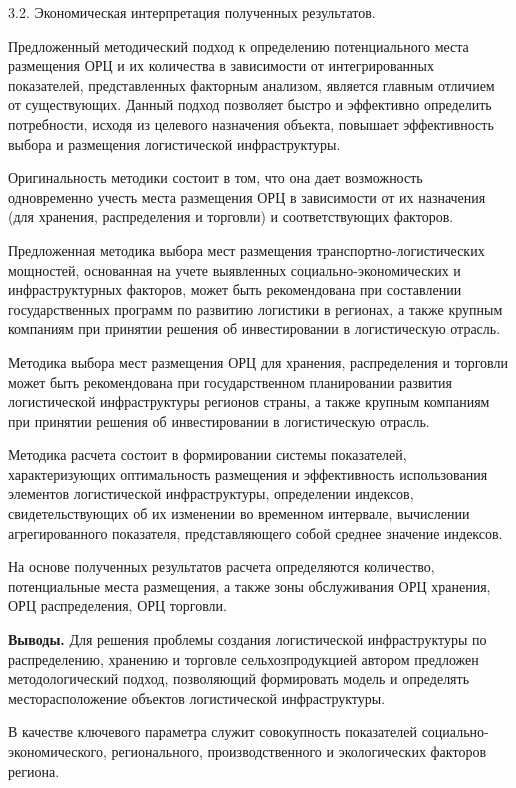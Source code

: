 3.2. Экономическая интерпретация полученных результатов.

Предложенный методический подход к определению потенциального места
размещения ОРЦ и их количества в зависимости от интегрированных
показателей, представленных факторным анализом, является главным
отличием от существующих. Данный подход позволяет быстро и эффективно
определить потребности, исходя из целевого назначения объекта, повышает
эффективность выбора и размещения логистической инфраструктуры.

Оригинальность методики состоит в том, что она дает возможность
одновременно учесть места размещения ОРЦ в зависимости от их назначения
(для хранения, распределения и торговли) и соответствующих факторов.

Предложенная методика выбора мест размещения транспортно-логистических
мощностей, основанная на учете выявленных социально-экономических и
инфраструктурных факторов, может быть рекомендована при составлении
государственных программ по развитию логистики в регионах, а также
крупным компаниям при принятии решения об инвестировании в логистическую
отрасль.

Методика выбора мест размещения ОРЦ для хранения, распределения и
торговли может быть рекомендована при государственном планировании
развития логистической инфраструктуры регионов страны, а также крупным
компаниям при принятии решения об инвестировании в логистическую
отрасль.

Методика расчета состоит в формировании системы показателей,
характеризующих оптимальность размещения и эффективность использования
элементов логистической инфраструктуры, определении индексов,
свидетельствующих об их изменении во временном интервале, вычислении
агрегированного показателя, представляющего собой среднее значение
индексов.

На основе полученных результатов расчета определяются количество,
потенциальные места размещения, а также зоны обслуживания ОРЦ хранения,
ОРЦ распределения, ОРЦ торговли.

{\bfseries Выводы.} Для решения проблемы создания логистической
инфраструктуры по распределению, хранению и торговле сельхозпродукцией
автором предложен методологический подход, позволяющий формировать
модель и определять месторасположение объектов логистической
инфраструктуры.

В качестве ключевого параметра служит совокупность показателей
социально-экономического, регионального, производственного и
экологических факторов региона.


